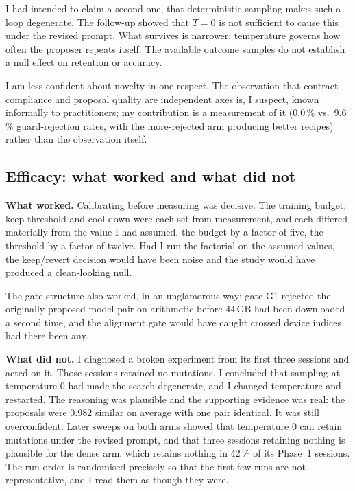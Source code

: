 I had intended to claim a second one, that deterministic sampling makes such a
loop degenerate. The follow-up showed that $T=0$ is not sufficient to cause this
under the revised prompt. What
survives is narrower: temperature governs how often the proposer repeats itself.
The available outcome samples do not establish a null effect on retention or
accuracy.

I am less confident about novelty in one respect. The observation that contract
compliance and proposal quality are independent axes is, I suspect, known
informally to practitioners; my contribution is a measurement of it
(0.0\,\% vs.\ 9.6\,\% guard-rejection rates, with the more-rejected arm producing
better recipes) rather than the observation itself.

\subsection{Efficacy: what worked and what did not}

\textbf{What worked.} Calibrating before measuring was decisive. The training
budget, keep threshold and cool-down were each set from measurement, and each
differed materially from the value I had assumed, the budget by a factor of
five, the threshold by a factor of twelve. Had I run the factorial on the assumed
values, the keep/revert decision would have been noise and the study would have
produced a clean-looking null.

The gate structure also worked, in an unglamorous way: gate G1 rejected the
originally proposed model pair on arithmetic before 44\,GB had been downloaded a
second time, and the alignment gate would have caught crossed device indices had
there been any.

\textbf{What did not.} I diagnosed a broken experiment from its first three
sessions and acted on it. Those sessions retained no mutations, I concluded that
sampling at temperature 0 had made the search degenerate, and I changed
temperature and restarted. The reasoning was plausible and the supporting
evidence was real: the proposals were 0.982 similar on average with one pair
identical. It was still overconfident. Later sweeps on both arms showed that
temperature 0 can retain mutations under the revised prompt, and that three
sessions retaining nothing is plausible for the dense arm, which retains nothing
in 42\,\% of its Phase~1 sessions. The
run order is randomised precisely so that the first few runs are not
representative, and I read them as though they were.

